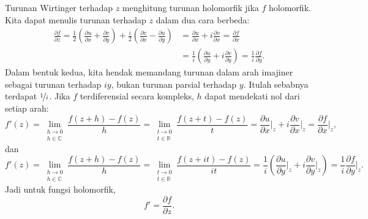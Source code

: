 \documentclass[12pt,openany]{book}
\newcommand{\C}{{\mathbb{C}}}
\newcommand{\R}{{\mathbb{R}}}
\theoremstyle{plain}
\theoremstyle{remark}
\theoremstyle{definition}
\theoremstyle{exercise}
\theoremstyle{example}
\begin{document}
Turunan Wirtinger terhadap $z$ menghitung turunan holomorfik
jika $f$ holomorfik.  Kita dapat menulis
turunan terhadap $z$ dalam dua cara berbeda:
\begin{equation*}
\begin{split}
\frac{\partial f}{\partial z} 
=
\frac{1}{2}
\left(
\frac{\partial u}{\partial x} 
+ \frac{\partial v}{\partial y}
\right)
+
\frac{i}{2}
\left( \frac{\partial v}{\partial x} - \frac{\partial u}{\partial y}
\right) 
& =
\frac{\partial u}{\partial x} 
+ i \frac{\partial v}{\partial x}
 =
\frac{\partial f}{\partial x}
\\
& =
\frac{1}{i} \left(
\frac{\partial u}{\partial y}
+ i
\frac{\partial v}{\partial y} 
\right)
 =
\frac{1}{i}
\frac{\partial f}{\partial y}
.
\end{split}
\end{equation*}
Dalam bentuk kedua, kita hendak memandang turunan dalam
arah imajiner sebagai turunan terhadap $iy$, bukan turunan parsial
terhadap $y$.  Itulah sebabnya terdapat $\nicefrac{1}{i}$.
Jika $f$ terdiferensial secara kompleks, $h$ dapat
mendekati nol dari setiap arah:
\begin{equation*}
f'(z) =
\lim_{\substack{h \to 0\\h\in\C}}
\frac{f(z+h)-f(z)}{h}
=
\lim_{\substack{t \to 0\\t\in\R}}
\frac{f(z+t)-f(z)}{t}
=
\frac{\partial u}{\partial x} \Big|_z
+ i \frac{\partial v}{\partial x}\Big|_z
 =
\frac{\partial f}{\partial x} \Big|_z ,
\end{equation*}
dan
\begin{equation*}
f'(z) =
\lim_{\substack{h \to 0\\h\in\C}}
\frac{f(z+h)-f(z)}{h}
=
\lim_{\substack{t \to 0\\t\in\R}}
\frac{f(z+it)-f(z)}{it}
=
\frac{1}{i}
\left(
\frac{\partial u}{\partial y}  \Big|_z
+ i \frac{\partial v}{\partial y} \Big|_z
\right)
 =
\frac{1}{i}
\frac{\partial f}{\partial y} \Big|_z .
\end{equation*}
Jadi untuk fungsi holomorfik,
\begin{equation*}
f' =
\frac{\partial f}{\partial z} .
\end{equation*}
\end{document}
